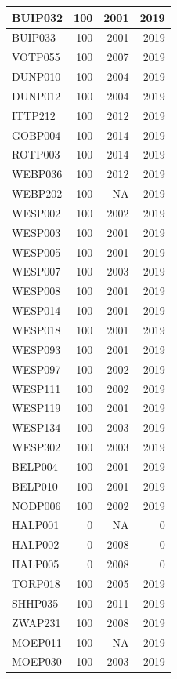 \documentclass[11pt,]{book}
\begin{document}
\begin{table}
\begin{tabular}[t]{l|r|r|r}
\hline
BUIP032 & 100 & 2001 & 2019\\
\hline
BUIP033 & 100 & 2001 & 2019\\
\hline
VOTP055 & 100 & 2007 & 2019\\
\hline
DUNP010 & 100 & 2004 & 2019\\
\hline
DUNP012 & 100 & 2004 & 2019\\
\hline
ITTP212 & 100 & 2012 & 2019\\
\hline
GOBP004 & 100 & 2014 & 2019\\
\hline
ROTP003 & 100 & 2014 & 2019\\
\hline
WEBP036 & 100 & 2012 & 2019\\
\hline
WEBP202 & 100 & NA & 2019\\
\hline
WESP002 & 100 & 2002 & 2019\\
\hline
WESP003 & 100 & 2001 & 2019\\
\hline
WESP005 & 100 & 2001 & 2019\\
\hline
WESP007 & 100 & 2003 & 2019\\
\hline
WESP008 & 100 & 2001 & 2019\\
\hline
WESP014 & 100 & 2001 & 2019\\
\hline
WESP018 & 100 & 2001 & 2019\\
\hline
WESP093 & 100 & 2001 & 2019\\
\hline
WESP097 & 100 & 2002 & 2019\\
\hline
WESP111 & 100 & 2002 & 2019\\
\hline
WESP119 & 100 & 2001 & 2019\\
\hline
WESP134 & 100 & 2003 & 2019\\
\hline
WESP302 & 100 & 2003 & 2019\\
\hline
BELP004 & 100 & 2001 & 2019\\
\hline
BELP010 & 100 & 2001 & 2019\\
\hline
NODP006 & 100 & 2002 & 2019\\
\hline
HALP001 & 0 & NA & 0\\
\hline
HALP002 & 0 & 2008 & 0\\
\hline
HALP005 & 0 & 2008 & 0\\
\hline
TORP018 & 100 & 2005 & 2019\\
\hline
SHHP035 & 100 & 2011 & 2019\\
\hline
ZWAP231 & 100 & 2008 & 2019\\
\hline
MOEP011 & 100 & NA & 2019\\
\hline
MOEP030 & 100 & 2003 & 2019\\
\hline

\end{tabular}
\end{table}
\end{document}
